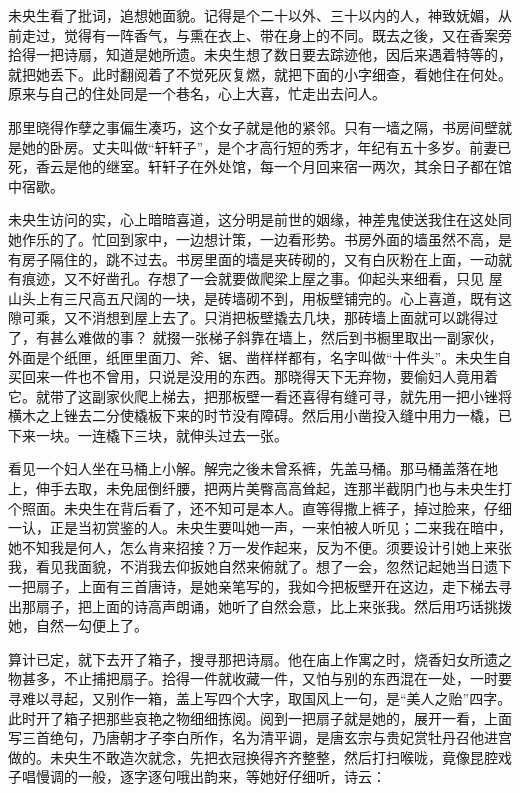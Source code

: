\documentclass[a4paper,12pt,UTF8,twoside]{ctexbook}
\begin{document}
未央生看了批词，追想她面貌。记得是个二十以外、三十以内的人，神致妩媚，从前走过，觉得有一阵香气，与熏在衣上、带在身上的不同。既去之後，又在香案旁拾得一把诗扇，知道是她所遗。未央生想了数日要去踪迹他，因后来遇着特等的，就把她丢下。此时翻阅着了不觉死灰复燃，就把下面的小字细查，看她住在何处。原来与自己的住处同是一个巷名，心上大喜，忙走出去问人。

那里晓得作孽之事偏生凑巧，这个女子就是他的紧邻。只有一墙之隔，书房间壁就是她的卧房。丈夫叫做“轩轩子”，是个才高行短的秀才，年纪有五十多岁。前妻已死，香云是他的继室。轩轩子在外处馆，每一个月回来宿一两次，其余日子都在馆中宿歇。

未央生访问的实，心上暗暗喜道，这分明是前世的姻缘，神差鬼使送我住在这处同她作乐的了。忙回到家中，一边想计策，一边看形势。书房外面的墙虽然不高，是有房子隔住的，跳不过去。书房里面的墙是夹砖砌的，又有白灰粉在上面，一动就有痕迹，又不好凿孔。存想了一会就要做爬梁上屋之事。仰起头来细看，只见 屋山头上有三尺高五尺阔的一块，是砖墙砌不到，用板壁铺完的。心上喜道，既有这隙可乘，又不消想到屋上去了。只消把板壁撬去几块，那砖墙上面就可以跳得过了，有甚么难做的事？ 就掇一张梯子斜靠在墙上，然后到书橱里取出一副家伙，外面是个纸匣，纸匣里面刀、斧、锯、凿样样都有，名字叫做“十件头”。未央生自买回来一件也不曾用，只说是没用的东西。那晓得天下无弃物，要偷妇人竟用着它。就带了这副家伙爬上梯去，把那板壁一看还喜得有缝可寻，就先用一把小锉将横木之上锉去二分使橇板下来的时节没有障碍。然后用小凿投入缝中用力一橇，已下来一块。一连橇下三块，就伸头过去一张。

看见一个妇人坐在马桶上小解。解完之後未曾系裤，先盖马桶。那马桶盖落在地上，伸手去取，未免屈倒纤腰，把两片美臀高高耸起，连那半截阴门也与未央生打个照面。未央生在背后看了，还不知可是本人。直等得撒上裤子，掉过脸来，仔细一认，正是当初赏鉴的人。未央生要叫她一声，一来怕被人听见；二来我在暗中，她不知我是何人，怎么肯来招接？万一发作起来，反为不便。须要设计引她上来张我，看见我面貌，不消我去仰扳她自然来俯就了。想了一会，忽然记起她当日遗下一把扇子，上面有三首唐诗，是她亲笔写的，我如今把板壁开在这边，走下梯去寻出那扇子，把上面的诗高声朗诵，她听了自然会意，比上来张我。然后用巧话挑拨她，自然一勾便上了。

算计已定，就下去开了箱子，搜寻那把诗扇。他在庙上作寓之时，烧香妇女所遗之物甚多，不止捕把扇子。拾得一件就收藏一件，又怕与别的东西混在一处，一时要寻难以寻起，又别作一箱，盖上写四个大字，取国风上一句，是“美人之贻”四字。此时开了箱子把那些哀艳之物细细拣阅。阅到一把扇子就是她的，展开一看，上面写三首绝句，乃唐朝才子李白所作，名为清平调，是唐玄宗与贵妃赏牡丹召他进宫做的。未央生不敢造次就念，先把衣冠换得齐齐整整，然后打扫喉咙，竟像昆腔戏子唱慢调的一般，逐字逐句哦出韵来，等她好仔细听，诗云：
\end{document}

